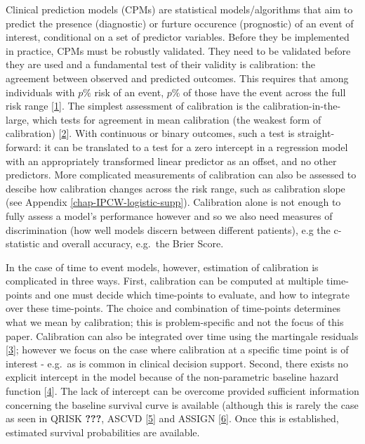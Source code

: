 \documentclass[
]{article}
\begin{document}
Clinical prediction models (CPMs) are statistical models/algorithms that aim to predict the presence (diagnostic) or furture occurence (prognostic) of an event of interest, conditional on a set of predictor variables. Before they be implemented in practice, CPMs must be robustly validated. They need to be validated before they are used and a fundamental test of their validity is calibration: the agreement between observed and predicted outcomes. This requires that among individuals with \(p\%\) risk of an event, \(p\%\) of those have the event across the full risk range {[}\protect\hyperlink{ref-steyerberg_clinical_2008}{1}{]}. The simplest assessment of calibration is the calibration-in-the-large, which tests for agreement in mean calibration (the weakest form of calibration) {[}\protect\hyperlink{ref-calster_calibration_2016-1}{2}{]}. With continuous or binary outcomes, such a test is straight-forward: it can be translated to a test for a zero intercept in a regression model with an appropriately transformed linear predictor as an offset, and no other predictors. More complicated measurements of calibration can also be assessed to descibe how calibration changes across the risk range, such as calibration slope (see Appendix \ref{chap-IPCW-logistic-supp}). Calibration alone is not enough to fully assess a model's performance however and so we also need measures of discrimination (how well models discern between different patients), e.g the c-statistic and overall accuracy, e.g.~the Brier Score.

In the case of time to event models, however, estimation of calibration is complicated in three ways. First, calibration can be computed at multiple time-points and one must decide which time-points to evaluate, and how to integrate over these time-points. The choice and combination of time-points determines what we mean by calibration; this is problem-specific and not the focus of this paper. Calibration can also be integrated over time using the martingale residuals {[}\protect\hyperlink{ref-crowson_assessing_2016}{3}{]}; however we focus on the case where calibration at a specific time point is of interest - e.g.~as is common in clinical decision support. Second, there exists no explicit intercept in the model because of the non-parametric baseline hazard function {[}\protect\hyperlink{ref-royston_external_2013}{4}{]}. The lack of intercept can be overcome provided sufficient information concerning the baseline survival curve is available (although this is rarely the case as seen in QRISK {\textbf{???}}, ASCVD {[}\protect\hyperlink{ref-goff_2013_2014}{5}{]} and ASSIGN {[}\protect\hyperlink{ref-de_la_iglesia_performance_2011}{6}{]}. Once this is established, estimated survival probabilities are available.
\end{document}
